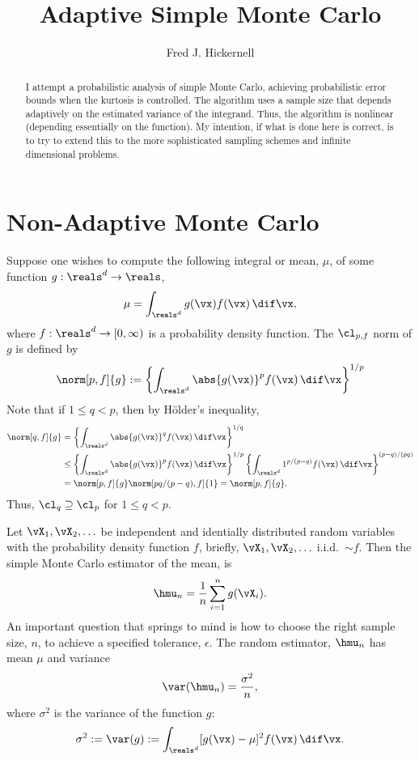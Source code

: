 \documentclass[12pt]{amsart}
\begin{document}
\title{Adaptive Simple Monte Carlo}
\author{Fred J. Hickernell}
\begin{abstract}I attempt a probabilistic analysis of simple Monte Carlo, achieving probabilistic error bounds when the kurtosis is controlled.  The algorithm uses a sample size that depends adaptively on the estimated variance of the integrand.  Thus, the algorithm is nonlinear (depending essentially on the function).  My intention, if what is done here is correct, is to try to extend this to the more sophisticated sampling schemes and infinite dimensional problems.
\end{abstract}
\maketitle

\section{Non-Adaptive Monte Carlo}
Suppose one wishes to compute the following integral or mean, $\mu$, of some function $g: \reals^d \to \reals$, 
\begin{equation*}
\mu= \int_{\reals^d} g(\vx) f(\vx) \, \dif \vx,
\end{equation*}
where $f: \reals^d \to [0,\infty)$ is a probability density function.  The $\cl_{p,f}$ norm of $g$ is defined by
\[
\norm[p,f]{g} :=\left\{\int_{\reals^d} \abs{g(\vx)}^p f(\vx) \, \dif \vx\right\}^{1/p}
\]
Note that if $1 \le q<p$, then by H\"older's inequality, 
\begin{align*}
\norm[q,f]{g} &=\left\{\int_{\reals^d} \abs{g(\vx)}^q f(\vx) \, \dif \vx\right\}^{1/q}\\ 
& \le \left\{\int_{\reals^d} \abs{g(\vx)}^p f(\vx) \, \dif \vx \right\}^{1/p} \left\{\int_{\reals^d} 1^{p/(p-q)} f(\vx) \, \dif \vx\right\}^{(p-q)/(pq)} \\
& = \norm[p,f]{g} \norm[pq/(p-q),f]{1} = \norm[p,f]{g}.
\end{align*}
Thus, $\cl_q \supseteq \cl_p$ for $1 \le q<p$.

Let $\vX_1, \vX_2, \ldots$ be independent and identially distributed random variables with the probability density function $f$, briefly, $\vX_1, \vX_2, \ldots$ i.i.d.\ $\sim f$.  Then the simple Monte Carlo estimator of the mean, is
\begin{equation} \label{simpleMCest}
\hmu_n = \frac 1n \sum_{i=1}^n g(\vX_i).
\end{equation}
An important question that springs to mind is how to choose the right sample size, $n$, to achieve a specified tolerance, $\epsilon$.  The random estimator, $\hmu_n$ has mean $\mu$ and variance
\begin{equation*}
\var(\hmu_n) = \frac{\sigma^2}{n},
\end{equation*}
where $\sigma^2$ is the variance of the function $g$:
\begin{equation} \label{sigmadef}
\sigma^2 := \var(g) := \int_{\reals^d} [g(\vx)-\mu]^2 f(\vx) \, \dif \vx.
\end{equation}
\end{document}
